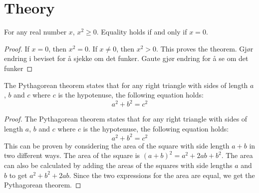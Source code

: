 \section{Theory}
\begin{thm}
    For any real number $x$, $x^2 \geq 0$. Equality holds if and only if $x=0$.
\end{thm}
\begin{proof}
    If $x=0$, then $x^2=0$. If $x\neq 0$, then $x^2 > 0$. This proves the theorem.
    Gjør endring i beviset for å sjekke om det funker.
    Gaute gjør endring for å se om det funker
\end{proof}

\begin{thm}
    The Pythagorean theorem states that for any right triangle with sides of length $a$, $b$ and $c$ where $c$ is the hypotenuse, the following equation holds:
    \begin{equation}
        a^2 + b^2 = c^2
    \end{equation}
\end{thm}
\begin{proof}
    The Pythagorean theorem states that for any right triangle with sides of length $a$, $b$ and $c$ where $c$ is the hypotenuse, the following equation holds:
    \begin{equation}
        a^2 + b^2 = c^2
    \end{equation}
    This can be proven by considering the area of the square with side length $a+b$ in two different ways. The area of the square is $(a+b)^2 = a^2 + 2ab + b^2$. The area can also be calculated by adding the areas of the squares with side lengths $a$ and $b$ to get $a^2 + b^2 + 2ab$. Since the two expressions for the area are equal, we get the Pythagorean theorem.
\end{proof}
